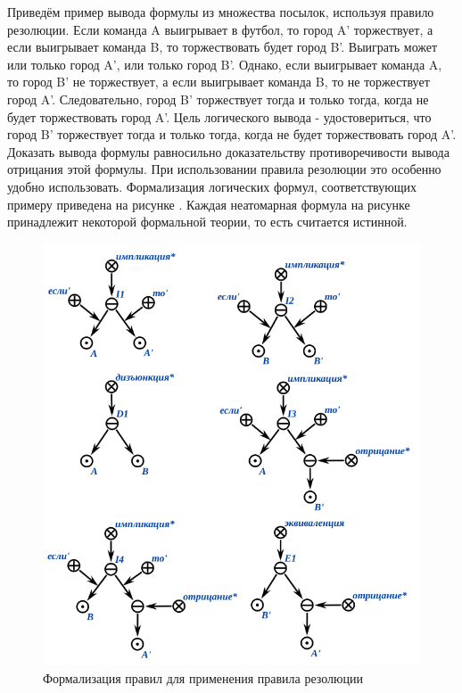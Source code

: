 Приведём пример вывода формулы из множества посылок, используя правило резолюции.
Если команда A выигрывает в футбол, то город A' торжествует, а если выигрывает команда B, то торжествовать будет город B'. Выиграть может или только город A', или только город B'. Однако, если выигрывает команда A, то город B' не торжествует, а если выигрывает команда B, то не торжествует город A'. Следовательно, город B' торжествует тогда и только тогда, когда не будет торжествовать город A'. Цель логического вывода - удостовериться, что город B' торжествует тогда и только тогда, когда не будет торжествовать город A'. Доказать вывода формулы равносильно доказательству противоречивости вывода отрицания этой формулы. При использовании правила резолюции это особенно удобно использовать.
Формализация логических формул, соответствующих примеру приведена на рисунке . Каждая неатомарная формула на рисунке принадлежит некоторой формальной теории, то есть считается истинной.

\begin{figure}[H]
	\includegraphics[scale=0.8]{author/part3/figures/resolution_formulas_example.png}
	\caption{Формализация правил для применения правила резолюции}
	\label{fig:resolution_formulas_example}
\end{figure}

